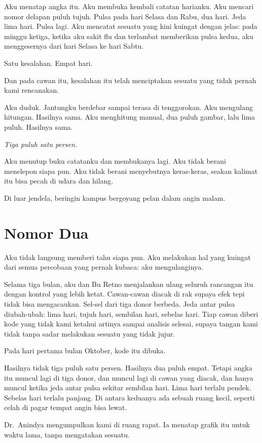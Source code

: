 \documentclass[11pt,twoside,openany]{book}
\begin{document}
Aku menatap angka itu. Aku membuka kembali catatan harianku. Aku mencari nomor delapan puluh tujuh. Pulsa pada hari Selasa dan Rabu, dua hari. Jeda lima hari. Pulsa lagi. Aku mencatat sesuatu yang kini kuingat dengan jelas: pada minggu ketiga, ketika aku sakit flu dan terlambat memberikan pulsa kedua, aku menggesernya dari hari Selasa ke hari Sabtu.

Satu kesalahan. Empat hari.

Dan pada cawan itu, kesalahan itu telah menciptakan sesuatu yang tidak pernah kami rencanakan.

Aku duduk. Jantungku berdebar sampai terasa di tenggorokan. Aku mengulang hitungan. Hasilnya sama. Aku menghitung manual, dua puluh gambar, lalu lima puluh. Hasilnya sama.

\emph{Tiga puluh satu persen.}

Aku menutup buku catatanku dan membukanya lagi. Aku tidak berani menelepon siapa pun. Aku tidak berani menyebutnya keras-keras, seakan kalimat itu bisa pecah di udara dan hilang.

Di luar jendela, beringin kampus bergoyang pelan dalam angin malam.

\chapter{Nomor Dua}
Aku tidak langsung memberi tahu siapa pun. Aku melakukan hal yang kuingat dari semua percobaan yang pernah kubaca: aku mengulanginya.

Selama tiga bulan, aku dan Bu Retno menjalankan ulang seluruh rancangan itu dengan kontrol yang lebih ketat. Cawan-cawan diacak di rak supaya efek tepi tidak bisa mengacaukan. Sel-sel dari tiga donor berbeda. Jeda antar pulsa diubah-ubah: lima hari, tujuh hari, sembilan hari, sebelas hari. Tiap cawan diberi kode yang tidak kami ketahui artinya sampai analisis selesai, supaya tangan kami tidak tanpa sadar melakukan sesuatu yang tidak jujur.

Pada hari pertama bulan Oktober, kode itu dibuka.

Hasilnya tidak tiga puluh satu persen. Hasilnya dua puluh empat. Tetapi angka itu muncul lagi di tiga donor, dan muncul lagi di cawan yang diacak, dan hanya muncul ketika jeda antar pulsa sekitar sembilan hari. Lima hari terlalu pendek. Sebelas hari terlalu panjang. Di antara keduanya ada sebuah ruang kecil, seperti celah di pagar tempat angin bisa lewat.

Dr.~Anindya mengumpulkan kami di ruang rapat. Ia menatap grafik itu untuk waktu lama, tanpa mengatakan sesuatu.
\end{document}
